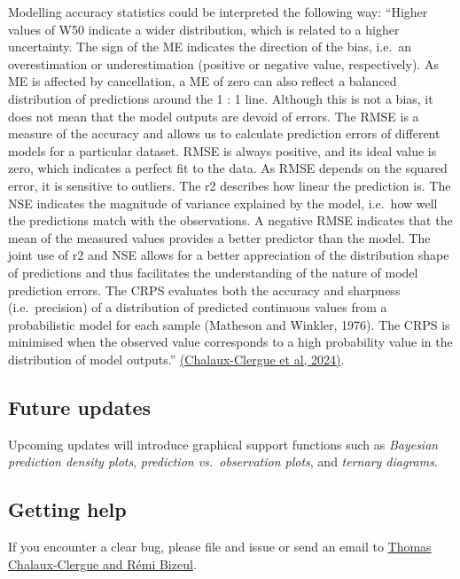 \documentclass[
]{article}
\begin{document}
Modelling accuracy statistics could be interpreted the following way:
``Higher values of W50 indicate a wider distribution, which is related
to a higher uncertainty. The sign of the ME indicates the direction of
the bias, i.e.~an overestimation or underestimation (positive or
negative value, respectively). As ME is affected by cancellation, a ME
of zero can also reflect a balanced distribution of predictions around
the 1 : 1 line. Although this is not a bias, it does not mean that the
model outputs are devoid of errors. The RMSE is a measure of the
accuracy and allows us to calculate prediction errors of different
models for a particular dataset. RMSE is always positive, and its ideal
value is zero, which indicates a perfect fit to the data. As RMSE
depends on the squared error, it is sensitive to outliers. The r2
describes how linear the prediction is. The NSE indicates the magnitude
of variance explained by the model, i.e.~how well the predictions match
with the observations. A negative RMSE indicates that the mean of the
measured values provides a better predictor than the model. The joint
use of r2 and NSE allows for a better appreciation of the distribution
shape of predictions and thus facilitates the understanding of the
nature of model prediction errors. The CRPS evaluates both the accuracy
and sharpness (i.e.~precision) of a distribution of predicted continuous
values from a probabilistic model for each sample (Matheson and Winkler,
1976). The CRPS is minimised when the observed value corresponds to a
high probability value in the distribution of model outputs.''
\href{10.5194/soil-10-109-2024}{(Chalaux-Clergue et al, 2024)}.

\hypertarget{future-updates}{%
\subsection{Future updates}\label{future-updates}}

Upcoming updates will introduce graphical support functions such as
\emph{Bayesian prediction density plots}, \emph{prediction
vs.~observation plots}, and \emph{ternary diagrams}.

\hypertarget{getting-help}{%
\subsection{Getting help}\label{getting-help}}

If you encounter a clear bug, please file and issue or send an email to
\href{mailto:thomaschalaux@icloud.com,\%20rbizeul59@gmail.com}{Thomas
Chalaux-Clergue and Rémi Bizeul}.
\end{document}
